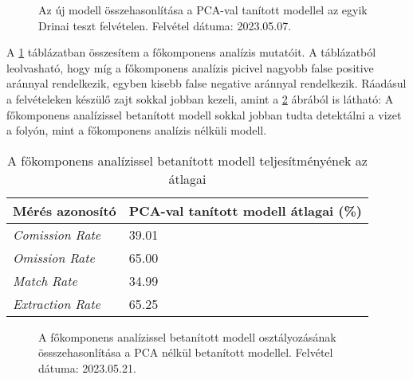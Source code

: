 \begin{figure}[H]
	\centering
	\hspace{5pt}
	\hspace{5pt}
	\caption{Az új modell összehasonlítása a PCA-val tanított modellel az egyik Drinai teszt felvételen. Felvétel dátuma: 2023.05.07.}
	\label{fig:pca-vs-no-pca}
\end{figure}

A \ref{tab:pca-vs-no-pca} táblázatban összesítem a főkomponens analízis mutatóit. A táblázatból leolvasható, hogy míg a főkomponens analízis picivel nagyobb false positive aránnyal rendelkezik, egyben kisebb false negative aránnyal rendelkezik. Ráadásul a felvételeken készülő zajt sokkal jobban kezeli, amint a \ref{fig:classification-pca-vs-no-pca} ábrából is látható: A főkomponens analízissel betanított modell sokkal jobban tudta detektálni a vizet a folyón, mint a főkomponens analízis nélküli modell.

\begin{table}[H]
	\centering
	\begin{tabular}{ | p{} | p{} | }
		\hline
		\textbf{Mérés azonosító} & \textbf{PCA-val tanított modell átlagai (\%)} \\
		\hline \hline
		\emph{Comission Rate} & 39.01 \\
		\hline
		\emph{Omission Rate} & 65.00 \\
		\hline
		\emph{Match Rate} & 34.99  \\
		\hline
        \emph{Extraction Rate} & 65.25 \\
		\hline
	\end{tabular}
	\caption{A főkomponens analízissel betanított modell teljesítményének az átlagai}
	\label{tab:pca-vs-no-pca}
\end{table}

\begin{figure}[H]
	\centering
	\hspace{5pt}
	\hspace{5pt}
	\caption{A főkomponens analízissel betanított modell osztályozásának össszehasonlítása a PCA nélkül betanított modellel. Felvétel dátuma: 2023.05.21.}
	\label{fig:classification-pca-vs-no-pca}
\end{figure}

